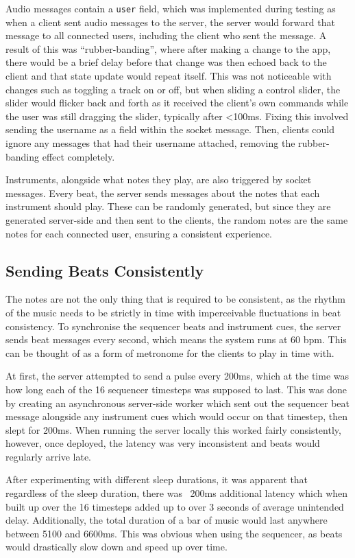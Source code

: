 Audio messages contain a \verb|user| field, which was implemented during testing as when a client sent audio messages to the server, the server would forward that message to all connected users, including the client who sent the message. A result of this was “rubber-banding”, where after making a change to the app, there would be a brief delay before that change was then echoed back to the client and that state update would repeat itself. This was not noticeable with changes such as toggling a track on or off, but when sliding a control slider, the slider would flicker back and forth as it received the client’s own commands while the user was still dragging the slider, typically after <100ms. Fixing this involved sending the username as a field within the socket message. Then, clients could ignore any messages that had their username attached, removing the rubber-banding effect completely.

Instruments, alongside what notes they play, are also triggered by socket messages. Every beat, the server sends messages about the notes that each instrument should play. These can be randomly generated, but since they are generated server-side and then sent to the clients, the random notes are the same notes for each connected user, ensuring a consistent experience.

\subsection{Sending Beats Consistently}
The notes are not the only thing that is required to be consistent, as the rhythm of the music needs to be strictly in time with imperceivable fluctuations in beat consistency. To synchronise the sequencer beats and instrument cues, the server sends beat messages every second, which means the system runs at 60 bpm. This can be thought of as a form of metronome for the clients to play in time with.

At first, the server attempted to send a pulse every 200ms, which at the time was how long each of the 16 sequencer timesteps was supposed to last. This was done by creating an asynchronous server-side worker which sent out the sequencer beat message alongside any instrument cues which would occur on that timestep, then slept for 200ms. When running the server locally this worked fairly consistently, however, once deployed, the latency was very inconsistent and beats would regularly arrive late.

After experimenting with different sleep durations, it was apparent that regardless of the sleep duration, there was ~200ms additional latency which when built up over the 16 timesteps added up to over 3 seconds of average unintended delay. Additionally, the total duration of a bar of music would last anywhere between 5100 and 6600ms. This was obvious when using the sequencer, as beats would drastically slow down and speed up over time.

